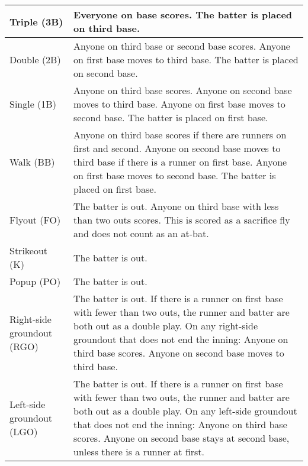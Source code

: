 \begin{deepEnumerate}
\begin{deepEnumerate}
\begin{center}
\begin{longtable}{|p{3cm}|p{8cm}|}
				\hline
				Triple (3B)                & Everyone on base scores.                                              
				The batter is placed on third base. \\
				\hline
				Double (2B)                & Anyone on third base or second base scores.                           
				Anyone on first base moves to third base.
				The batter is placed on second base. \\
				\hline
				Single (1B)                & Anyone on third base scores.                                          
				Anyone on second base moves to third base.
				Anyone on first base moves to second base.
				The batter is placed on first base. \\
				\hline
				Walk (BB)                  & Anyone on third base scores if there are runners on first and second. 
				Anyone on second base moves to third base if there is a runner on first base.
				Anyone on first base moves to second base.
				The batter is placed on first base. \\
				\hline 
				Flyout (FO)                & The batter is out.                                                    
				Anyone on third base with less than two outs scores. 
				This is scored as a sacrifice fly and does not count as an at-bat. \\
				\hline
				Strikeout (K)              & The batter is out.                                                    \\
				\hline
				Popup (PO)                 & The batter is out.                                                    \\
				\hline
				Right-side groundout (RGO) & The batter is out.                                                    
				If there is a runner on first base with fewer than two outs, the runner and batter are both out as a double play.
				On any right-side groundout that does not end the inning:
				Anyone on third base scores.
				Anyone on second base moves to third base. \\
				\hline
				Left-side groundout (LGO)  & The batter is out.                                                    
				If there is a runner on first base with fewer than two outs, the runner and batter are both out as a double play.
				On any left-side groundout that does not end the inning:
				Anyone on third base scores.
				Anyone on second base stays at second base, unless there is a runner at first. \\
				\hline
			\end{longtable}

\end{center}
\end{deepEnumerate}
\end{deepEnumerate}
